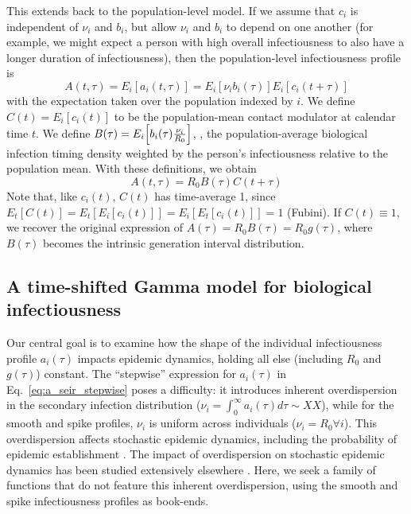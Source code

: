This extends back to the population-level model. If we assume that $c_i$ is independent of $\nu_i$ and $b_i$, but allow $\nu_i$ and $b_i$ to depend on one another (for example, we might expect a person with high overall infectiousness to also have a longer duration of infectiousness), then the population-level infectiousness profile is 
%
\begin{equation}
    A(t, \tau) = E_i[a_i(t,\tau)] = E_i[\nu_i b_i(\tau)] E_i[c_i(t + \tau)]
    \label{eq:A_def_general}
\end{equation}
%
with the expectation taken over the population indexed by $i$. We define $C(t) = E_i[c_i(t)]$ to be the population-mean contact modulator at calendar time $t$. We define $B(\tau) = E_i\Bigl[b_i(\tau) \frac{\nu_i}{R_0}\Bigr]$, \ie, the population-average biological infection timing density weighted by the person's infectiousness relative to the population mean. With these definitions, we obtain 
%
\begin{equation}
    A(t, \tau) = R_0 B(\tau) C(t +\tau)
    \label{eq:ABC}
\end{equation}
%
Note that, like $c_i(t)$, $C(t)$ has time-average 1, since $E_t[C(t)] = E_t[E_i[c_i(t)]] = E_i[E_t[c_i(t)]] = 1$ (Fubini). If $C(t) \equiv 1$, we recover the original expression of $A(\tau) = R_0 B(\tau) = R_0 g(\tau)$, where $B(\tau)$ becomes the intrinsic generation interval distribution. 


\subsection{A time-shifted Gamma model for biological infectiousness}

Our central goal is to examine how the shape of the individual infectiousness profile $a_i(\tau)$ impacts epidemic dynamics, holding all else (including $R_0$ and $g(\tau)$) constant. The ``stepwise'' expression for $a_i(\tau)$ in Eq.~\ref{eq:a_seir_stepwise} poses a difficulty: it introduces inherent overdispersion in the secondary infection distribution ($\nu_i = \int_0^\infty a_i(\tau) d\tau \sim XX$), while for the smooth and spike profiles, $\nu_i$ is uniform across individuals ($\nu_i = R_0 \forall i$). This overdispersion affects stochastic epidemic dynamics, including the probability of epidemic establishment \citep{lloyd-smith_superspreading_2005}. The impact of overdispersion on stochastic epidemic dynamics has been studied extensively elsewhere \citep{lloyd-smith_superspreading_2005}. Here, we seek a family of functions that do not feature this inherent overdispersion, using the smooth and spike infectiousness profiles as book-ends. 

